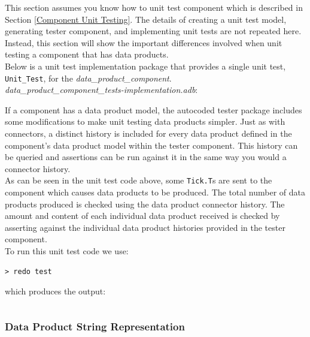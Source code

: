 This section assumes you know how to unit test component which is described in Section \ref{Component Unit Testing}. The details of creating a unit test model, generating tester component, and implementing unit tests are not repeated here. Instead, this section will show the important differences involved when unit testing a component that has data products. \\

Below is a unit test implementation package that provides a single unit test, \texttt{Unit\_Test}, for the \textit{data\_product\_component}. \\

\textit{data\_product\_component\_tests-implementation.adb}:

If a component has a data product model, the autocoded tester package includes some modifications to make unit testing data products simpler. Just as with connectors, a distinct history is included for every data product defined in the component's data product model within the tester component. This history can be queried and assertions can be run against it in the same way you would a connector history. \\

As can be seen in the unit test code above, some \texttt{Tick.T}s are sent to the component which causes data products to be produced. The total number of data products produced is checked using the data product connector history. The amount and content of each individual data product received is checked by asserting against the individual data product histories provided in the tester component. \\

To run this unit test code we use:

\vspace{5mm} %
\begin{verbatim}
> redo test
\end{verbatim}
\vspace{5mm} %

which produces the output:

\vspace{5mm} %
\inputminted{text}{../example_architecture/data_product_component/test/output.txt}
\vspace{5mm} %

\subsubsection{Data Product String Representation} \label{Data Product String Representation}


